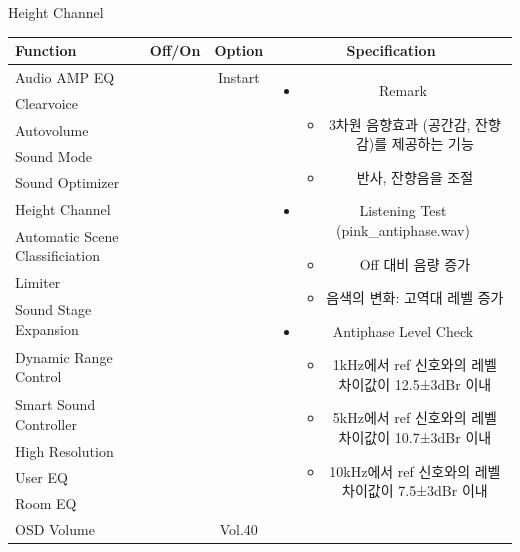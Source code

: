 \documentclass{beamer}
\begin{document}
\begin{frame}[t]{Height Channel}
\begin{tiny}
\begin{tabular}{@{}lccc@{}}
\toprule
Function & Off/On & Option & Specification \\
\midrule
Audio AMP EQ & \color{black}{Off} & Instart &
\multirow{14}{60mm}{
\begin{itemize}
\item Remark
	\begin{itemize}
	\item 3차원 음향효과 (공간감, 잔향감)를 제공하는 기능
	\item 반사, 잔향음을 조절
	\end{itemize}
\item Listening Test (pink\_antiphase.wav)
	\begin{itemize}
	\item Off 대비 음량 증가
	\item 음색의 변화: 고역대 레벨 증가
	\end{itemize}
\item Antiphase Level Check
  \begin{itemize}
  \item 1kHz에서 ref 신호와의 레벨 차이값이 12.5±3dBr 이내
  \item 5kHz에서 ref 신호와의 레벨 차이값이 10.7±3dBr 이내
  \item 10kHz에서 ref 신호와의 레벨 차이값이 7.5±3dBr 이내
  \end{itemize}
\end{itemize}
} \\
Clearvoice & \color{black}{Off} & & \\
Autovolume & \color{black}{Off} & & \\
Sound Mode & \color{black}{Off} & & \\
Sound Optimizer & \color{black}{Off} & & \\
Height Channel & \color{blue}{On} & & \\
Automatic Scene Classificiation & \color{black}{Off} & & \\
Limiter & \color{black}{Off} & & \\
Sound Stage Expansion & \color{black}{Off} & & \\
Dynamic Range Control & \color{black}{Off} & & \\
Smart Sound Controller & \color{black}{Off} & & \\
High Resolution & \color{black}{Off} & & \\
User EQ & \color{black}{Off} & & \\
Room EQ & \color{black}{Off} & & \\
OSD Volume & \color{blue}{On} & Vol.40 & \\
\midrule
\end{tabular}
\end{tiny}

\end{frame}
\end{document}

